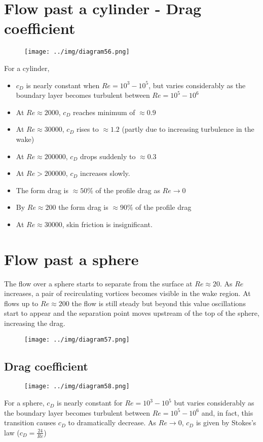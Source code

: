\documentclass[class=report, crop=false, 12pt,a4paper]{standalone}
\begin{document}
\section{Flow past a cylinder - Drag coefficient}
\begin{figure}[H]
  \centering
  \texttt{[image: ../img/diagram56.png]}
\end{figure}
For a cylinder, 
\begin{itemize}
  \item $c_D$ is nearly constant when $Re = 10^3 - 10^5$, but varies considerably as the boundary layer becomes turbulent between $Re = 10^5 - 10^6$
  \item At $Re \approx 2000$, $c_D$ reaches minimum of $\approx 0.9$
  \item At $Re \approx 30000$, $c_D$ rises to $\approx 1.2$ (partly due to increasing turbulence in the wake)
  \item At $Re \approx 200000$, $c_D$ drops suddenly to $\approx 0.3$
  \item At $Re > 200000$, $c_D$ increases slowly. 
  \item The form drag is $\approx 50\%$ of the profile drag as $Re \rightarrow 0$
  \item By $Re \approx 200$ the form drag is $\approx 90\%$ of the profile drag
  \item At $Re \approx 30000$, skin friction is insignificant.
\end{itemize}
\section{Flow past a sphere}
The flow over a sphere starts to separate from the surface at $Re \approx 20$. As $Re$ increases, a pair of recirculating vortices becomes visible in the wake region. At flows up to $Re \approx 200$ the flow is still steady but beyond this value oscillations start to appear and the separation point moves upstream of the top of the sphere, increasing the drag. 
\begin{figure}[H]
  \centering
  \texttt{[image: ../img/diagram57.png]}
\end{figure}
\subsection{Drag coefficient}
\begin{figure}[H]
  \centering
  \texttt{[image: ../img/diagram58.png]}
\end{figure}
For a sphere, $c_D$ is nearly constant for $Re = 10^3 - 10^5$ but varies considerably as the boundary layer becomes turbulent between $Re = 10^5 - 10^6$ and, in fact, this transition causes $c_D$ to dramatically decrease. As $Re \rightarrow 0$, $c_D$ is given by Stokes's law ($c_D = \frac{24}{Re}$)
\end{document}
